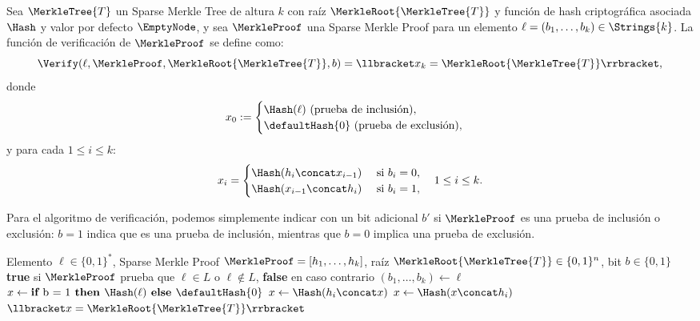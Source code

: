 \begin{definition}
	Sea $\MerkleTree{T}$ un Sparse Merkle Tree de altura $k$ con raíz $\MerkleRoot{\MerkleTree{T}}$ y función de hash criptográfica asociada $\Hash$ y valor por defecto $\EmptyNode$, y sea $\MerkleProof$ una Sparse Merkle Proof para un elemento $\ell = (b_1, \ldots, b_k) \in \Strings{k}$. La función de verificación de $\MerkleProof$ se define como:
		$$\Verify(\ell, \MerkleProof, \MerkleRoot{\MerkleTree{T}}, b) = \llbracket x_k = \MerkleRoot{\MerkleTree{T}} \rrbracket,$$
	donde
	$$x_0 := \begin{cases}
		\Hash(\ell) \text{ (prueba de inclusión)}, \\
			\defaultHash{0} \text{ (prueba de exclusión)},
	\end{cases}$$
	y para cada $1 \leq i \leq k$:
	$$x_i = \begin{cases}
		\Hash(h_i \concat x_{i-1}) & \text{ si } b_i = 0, \\
		\Hash(x_{i-1} \concat h_i) & \text{ si } b_i = 1,
	\end{cases} \quad 1 \leq i \leq k.$$
\end{definition}

Para el algoritmo de verificación, podemos simplemente indicar con un bit adicional $b'$ si $\MerkleProof$ es una prueba de inclusión o exclusión: $b = 1$ indica que es una prueba de inclusión, mientras que $b = 0$ implica una prueba de exclusión.

\begin{algorithm}[ht]
	\caption{Verificación de una Sparse Merkle Proof}
	\label{alg:verify-sparse-merkle-proof}
	\begin{algorithmic}[1]
		\Require Elemento $\ell \in \{0,1\}^*$, Sparse Merkle Proof $\MerkleProof = [h_1, \ldots, h_k]$, raíz $\MerkleRoot{\MerkleTree{T}} \in \{0,1\}^n$, bit $b \in \{0,1\}$
		\Ensure \textbf{true} si $\MerkleProof$ prueba que $\ell \in L$ o $\ell \notin L$, \textbf{false} en caso contrario
		\State $(b_1, \ldots, b_k) \gets \ell$ 
		\State $x \gets \textbf{if } \text{b = 1} \textbf{ then } \Hash(\ell) \textbf{ else } \defaultHash{0}$
			 
				\State $x \gets \Hash(h_i \concat x)$
			\Else {}
				\State $x \gets \Hash(x \concat h_i)$
			\EndIf
		\EndFor
		\State \Return $\llbracket x = \MerkleRoot{\MerkleTree{T}} \rrbracket$
	\end{algorithmic}
\end{algorithm}

